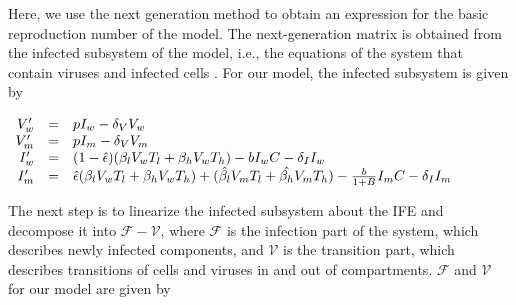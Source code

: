 \documentclass[11pt, oneside]{article}    %
\begin{document}




Here, we use the next generation method \cite{Diekmann} to obtain an expression for the basic reproduction number of the model. The next-generation matrix is obtained from the infected subsystem of the model, i.e., the equations of the system that contain viruses and infected cells \cite{Diekmann}. For our model, the infected subsystem is given by

\vspace{5mm}

$\begin{array}{rcl}\label
VV_w' & = & p I_w - \delta_V V_w\\
V_m' & = & p I_m - \delta_V V_m\\
I_w' & = & (1-\hat{\epsilon})(\beta_l V_w T_l + \beta_h V_w T_h) - b I_w C - \delta_I I_w\\
I_m' & = & \hat{\epsilon}(\beta_l V_w T_l + \beta_h V_w T_h) +  (\hat{\beta_l} V_m T_l +\hat{\beta_h} V_m T_h)  -\frac{b}{1+B} I_m C -\delta_I I_m\\
\end{array}$

\vspace{5mm}

The next step is to linearize the infected subsystem about the IFE and decompose it into  $\mathcal F - \mathcal V$, where $\mathcal F$ is the infection part of the system, which describes newly infected components, and $\mathcal V$ is the transition part, which describes transitions of cells and viruses in and out of compartments.  $\mathcal F$ and $\mathcal V$  for our model are given by
\end{document}
